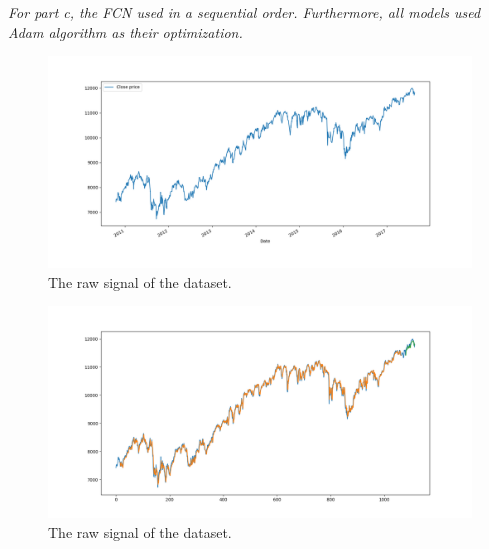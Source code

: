 \textit{For part c, the FCN used in a sequential order. Furthermore, all models used Adam algorithm as their optimization.}




























\begin{figure}[H]
    \centering
    \begin{minipage}[b]{1\textwidth}
        \includegraphics[width=\textwidth]{manuscript/src/figures/Ass4/Ass4_Q2a_raw_signal.png}
    \end{minipage}
    \caption{The raw signal of the dataset.}
    \label{fig:Ass4_Q2a_raw_signal}
\end{figure}

\begin{figure}[H]
    \centering
    \begin{minipage}[b]{1\textwidth}
        \includegraphics[width=\textwidth]{manuscript/src/figures/Ass4/Ass4_Q2a_forcasted.png}
    \end{minipage}
    \caption{The raw signal of the dataset.}
    \label{fig:Ass4_Q2a_forcasted}
\end{figure}

